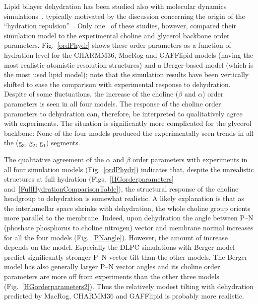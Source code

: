 \documentclass[journal=jpcbfk,manuscript=article]{achemso}
\begin{document}
Lipid bilayer dehydration has been studied also with molecular dynamics simulations~\cite{mashl01,pertsin05,pertsin07,eun09,eun10,schneck12},
typically motivated by the  discussion concerning the origin of the ``hydration repulsion''~\cite{israelachvili,israelachvili96,sparr11}.
Only one~\cite{mashl01} of these studies, however, compared their simulation model to the experimental choline and glycerol backbone
order parameters.
Fig.~\ref{ordPhydr} shows these order parameters as a function of hydration level for the CHARMM36, 
MacRog and GAFFlipid models (having the most realistic atomistic resolution structures) and a Berger-based model 
(which is the most used lipid model);
note that the simulation results have been vertically shifted to ease the comparison with experimental response to dehydration.
Despite of some fluctuations, the increase of the choline ($\beta$ and $\alpha$) order parameters is seen in all four
models. The response of the choline order parameters to dehydration can, therefore, be
interpreted to qualitatively agree with experiments.
The situation is significantly more complicated for the glycerol backbone: 
None of the four models produced the experimentally seen trends
in all the (g$_{3}$, g$_{2}$, g$_{1}$) segments.

The qualitative agreement of the $\alpha$ and $\beta$ order parameters with experiments in all four simulation models (Fig.~\ref{ordPhydr}) indicates that,
despite the unrealistic structures at full hydration (Figs.~\ref{HGorderparameters} and~\ref{FullHydrationComparisonTable}),
the structural response of the choline headgroup to dehydration is somewhat realistic.
A likely explanation is that as the interlamellar space shrinks with dehydration, the whole choline group
orients more parallel to the membrane.
Indeed, upon dehydration the angle between P--N (phoshate phosphorus to choline nitrogen) vector and membrane normal increases for
all the four models (Fig.~\ref{PNangle}). However,
the amount of increase depends on the model. Especially the DLPC simulations with Berger model
predict significantly stronger P--N vector tilt than the other models. The Berger model
has also generally larger P--N vector angles and its choline order parameters are more off from
experiments than the other three models (Fig.~\ref{HGorderparameters2}). Thus the relatively modest tilting with dehydration
predicted by MacRog, CHARMM36 and GAFFlipid is probably more realistic.
\end{document}
